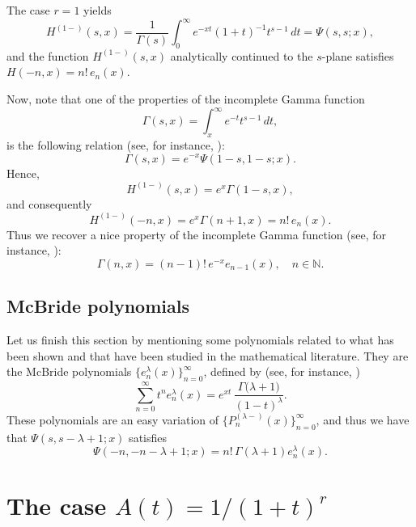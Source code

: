 \documentclass[11pt,a4paper]{amsart}
\newcommand{\N}{\mathbb{N}}
\theoremstyle{plain}
\theoremstyle{plain}
\theoremstyle{remark}
\numberwithin{equation}{section}
\begin{document}
The case $r=1$ yields
\begin{equation*}
  H^{(1-)}(s,x) = \frac{1}{\Gamma(s)} \int_{0}^{\infty} e^{-xt}(1+t)^{-1} t^{s-1} \,dt 
  = \Psi(s,s;x),
\end{equation*}
and the function $H^{(1-)}(s,x)$ analytically continued to the $s$-plane satisfies $H(-n,x) = n!\,e_n(x)$.

Now, note that one of the properties of the incomplete Gamma function
\begin{equation}
\label{eq:incompletes}
  \Gamma(s,x) = \int_x^{\infty} e^{-t} t^{s-1} \,dt,
\end{equation}
is the following relation (see, for instance, \cite[\S\,9.1, equation~(4)]{EMOT-HTF-v2}):
\begin{equation}
\label{eq:gamm-conf}
  \Gamma(s,x) = e^{-x}\Psi(1-s,1-s;x).
\end{equation}
Hence, 
\begin{equation}
\label{eq:H-case1-t}
  H^{(1-)}(s,x) = e^x \Gamma(1-s,x),
\end{equation}
and consequently
\begin{equation}
\label{eq:H1-n}
  H^{(1-)}(-n,x) = e^x \Gamma(n+1,x) = n! \,e_{n}(x).
\end{equation}
Thus we recover a nice property of the incomplete Gamma function (see, for instance, \cite[8.4.8]{Par-NIST}):
\begin{equation}
\label{eq:incompleten}
  \Gamma(n,x) = (n-1)!\,e^{-x} e_{n-1}(x), \quad n\in\N.
\end{equation}

\subsection{McBride polynomials}
Let us finish this section by mentioning some polynomials related to what has been shown and that have been studied in the mathematical literature.
They are the McBride polynomials $\{e_n^{\lambda}(x)\}_{n=0}^{\infty}$, defined by (see, for instance, \cite[equation~(12)]{DCS})
\[
  \sum_{n=0}^{\infty} t^n e_n^{\lambda}(x) = e^{xt} \, \frac{\Gamma{(\lambda+1})}{(1-t)^{\lambda}}.
\]
These polynomials are an easy variation of $\{P_n^{(\lambda-)}(x)\}_{n=0}^{\infty}$, and thus we have that 
$\Psi(s,s-\lambda+1;x)$ satisfies
\[
  \Psi(-n,-n-\lambda+1;x) = n!\,\Gamma(\lambda+1)e_n^{\lambda}(x).
\]

\section{The case $A(t) = 1/(1+t)^r$}
\label{sec:1+tr}
\end{document}
